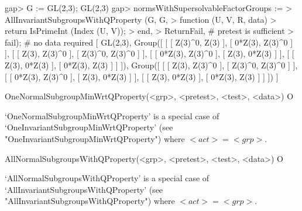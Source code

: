 \beginexample
gap> G := GL(2,3);
GL(2,3)
gap> normsWithSupersolvableFactorGroups :=
> AllInvariantSubgroupsWithQProperty (G, G, 
>    function (U, V, R, data)
>       return IsPrimeInt (Index (U, V));
>    end,
>    ReturnFail, # pretest is sufficient
>    fail); # no data required
[ GL(2,3), 
  Group([ [ [ Z(3)^0, Z(3) ], [ 0*Z(3), Z(3)^0 ] ],
      [ [ Z(3), Z(3)^0 ], [ Z(3)^0, Z(3)^0 ] ], 
      [ [ 0*Z(3), Z(3)^0 ], [ Z(3), 0*Z(3) ] ], 
      [ [ Z(3), 0*Z(3) ], [ 0*Z(3), Z(3) ] ] ]), 
  Group([ [ [ Z(3), Z(3)^0 ], [ Z(3)^0, Z(3)^0 ] ], 
      [ [ 0*Z(3), Z(3)^0 ], [ Z(3), 0*Z(3) ] ], 
      [ [ Z(3), 0*Z(3) ], [ 0*Z(3), Z(3) ] ] ]) ]
\endexample


\>OneNormalSubgroupMinWrtQProperty(<grp>, <pretest>, <test>, <data>) O

`OneNormalSubgroupMinWrtQProperty' is a special case of 
`OneInvariantSubgroupMinWrtQProperty' (see
"OneInvariantSubgroupMinWrtQProperty") where $<act> = <grp>$. 

\>AllNormalSubgroupsWithQProperty(<grp>, <pretest>, <test>, <data>) O

`AllNormalSubgroupsWithQProperty' is a special case of 
`AllInvariantSubgroupsWithQProperty' (see
"AllInvariantSubgroupsWithQProperty") where $<act> = <grp>$. 


